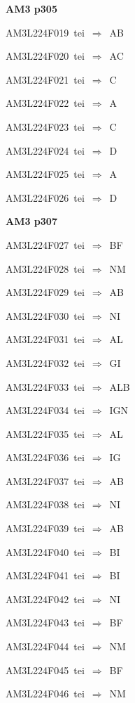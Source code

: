 \par\vfill\eject
{\bf\hfill AM3 p305\hfill\hbox{}}\par\bigskip
{\sixrm AM3L224F019\ {\sixit tei}\ }$\Rightarrow$\ AB\par\smallskip
{\sixrm AM3L224F020\ {\sixit tei}\ }$\Rightarrow$\ AC\par\smallskip
{\sixrm AM3L224F021\ {\sixit tei}\ }$\Rightarrow$\ C\par\smallskip
{\sixrm AM3L224F022\ {\sixit tei}\ }$\Rightarrow$\ A\par\smallskip
{\sixrm AM3L224F023\ {\sixit tei}\ }$\Rightarrow$\ C\par\smallskip
{\sixrm AM3L224F024\ {\sixit tei}\ }$\Rightarrow$\ D\par\smallskip
{\sixrm AM3L224F025\ {\sixit tei}\ }$\Rightarrow$\ A\par\smallskip
{\sixrm AM3L224F026\ {\sixit tei}\ }$\Rightarrow$\ D\par\smallskip

\par\vfill\eject
{\bf\hfill AM3 p307\hfill\hbox{}}\par\bigskip
{\sixrm AM3L224F027\ {\sixit tei}\ }$\Rightarrow$\ BF\par\smallskip
{\sixrm AM3L224F028\ {\sixit tei}\ }$\Rightarrow$\ NM\par\smallskip
{\sixrm AM3L224F029\ {\sixit tei}\ }$\Rightarrow$\ AB\par\smallskip
{\sixrm AM3L224F030\ {\sixit tei}\ }$\Rightarrow$\ NI\par\smallskip
{\sixrm AM3L224F031\ {\sixit tei}\ }$\Rightarrow$\ AL\par\smallskip
{\sixrm AM3L224F032\ {\sixit tei}\ }$\Rightarrow$\ GI\par\smallskip
{\sixrm AM3L224F033\ {\sixit tei}\ }$\Rightarrow$\ ALB\par\smallskip
{\sixrm AM3L224F034\ {\sixit tei}\ }$\Rightarrow$\ IGN\par\smallskip
{\sixrm AM3L224F035\ {\sixit tei}\ }$\Rightarrow$\ AL\par\smallskip
{\sixrm AM3L224F036\ {\sixit tei}\ }$\Rightarrow$\ IG\par\smallskip
{\sixrm AM3L224F037\ {\sixit tei}\ }$\Rightarrow$\ AB\par\smallskip
{\sixrm AM3L224F038\ {\sixit tei}\ }$\Rightarrow$\ NI\par\smallskip
{\sixrm AM3L224F039\ {\sixit tei}\ }$\Rightarrow$\ AB\par\smallskip
{\sixrm AM3L224F040\ {\sixit tei}\ }$\Rightarrow$\ BI\par\smallskip
{\sixrm AM3L224F041\ {\sixit tei}\ }$\Rightarrow$\ BI\par\smallskip
{\sixrm AM3L224F042\ {\sixit tei}\ }$\Rightarrow$\ NI\par\smallskip
{\sixrm AM3L224F043\ {\sixit tei}\ }$\Rightarrow$\ BF\par\smallskip
{\sixrm AM3L224F044\ {\sixit tei}\ }$\Rightarrow$\ NM\par\smallskip
{\sixrm AM3L224F045\ {\sixit tei}\ }$\Rightarrow$\ BF\par\smallskip
{\sixrm AM3L224F046\ {\sixit tei}\ }$\Rightarrow$\ NM\par\smallskip

